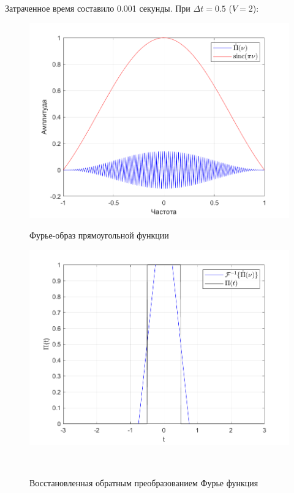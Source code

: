 \documentclass[a4paper]{article}
\begin{document}
Затраченное время составило 0.001 секунды. При $\Delta t = 0.5$ ($V = 2$):

\begin{figure}[H]
    \begin{minipage}{0.5\textwidth}
        \centering \includegraphics[width=\textwidth]{graphs/2/T_100_dt_0.5_V_2_dv_0.01/fourier_numerical.png}
        \caption{Фурье-образ прямоугольной функции}
    \end{minipage}\hfill
    \begin{minipage}{0.5\textwidth}
        \centering \includegraphics[width=\textwidth]{graphs/2/T_100_dt_0.5_V_2_dv_0.01/func_inversed_fourier.png}
        \caption{Восстановленная обратным преобразованием Фурье функция}
    \end{minipage}\\[1em]
\end{figure}\noindent\
\end{document}
